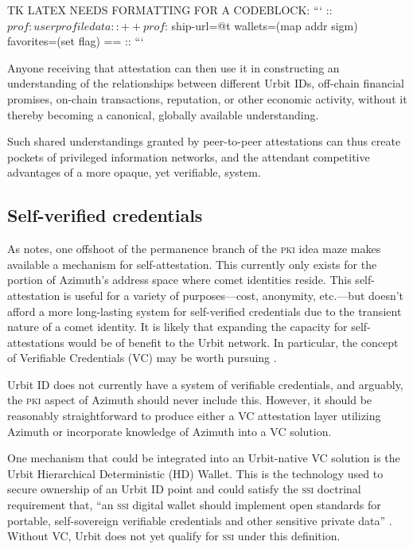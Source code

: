 \documentclass[twoside]{article}
\begin{document}
TK LATEX NEEDS FORMATTING FOR A CODEBLOCK:
```
::  $prof: user profile data
::
++  prof
  $:  ship-url=@t
      wallets=(map addr sigm)
      favorites=(set flag)
  ==
::
```

Anyone receiving that attestation can then use it in constructing an understanding of the relationships between different Urbit IDs, off-chain financial promises, on-chain transactions, reputation, or other economic activity, without it thereby becoming a canonical, globally available understanding.

Such shared understandings granted by peer-to-peer attestations can thus create pockets of privileged information networks, and the attendant competitive advantages of a more opaque, yet verifiable, system.

\subsection{Self-verified credentials}

As  notes, one offshoot of the permanence branch of the \textsc{pki} idea maze makes available a mechanism for self-attestation. This currently only exists for the portion of Azimuth's address space where comet identities reside. This self-attestation is useful for a variety of purposes—cost, anonymity, etc.—but doesn't afford a more long-lasting system for self-verified credentials due to the transient nature of a comet identity. It is likely that expanding the capacity for self-attestations would be of benefit to the Urbit network. In particular, the concept of Verifiable Credentials (VC) may be worth pursuing \citep{W3C2022a}.

Urbit ID does not currently have a system of verifiable credentials, and arguably, the \textsc{pki} aspect of Azimuth should never include this. However, it should be reasonably straightforward to produce either a VC attestation layer utilizing Azimuth or incorporate knowledge of Azimuth into a VC solution.

One mechanism that could be integrated into an Urbit-native VC solution is the Urbit Hierarchical Deterministic (HD) Wallet. This is the technology used to secure ownership of an Urbit ID point and could satisfy the \textsc{ssi} doctrinal requirement that, ``an \textsc{ssi} digital wallet should implement open standards for portable, self-sovereign verifiable credentials and other sensitive private data'' \citep{Preukschat2021}. Without VC, Urbit does not yet qualify for \textsc{ssi} under this definition.
\end{document}
